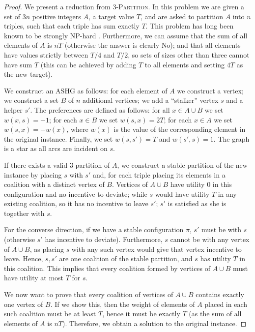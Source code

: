 \documentclass[letterpaper,USenglish,cleveref, autoref, thm-restate]{lipics-v2021}
\begin{document}
\begin{proof} We present a reduction from \textsc{3-Partition}. In this problem
we are given a set of $3n$ positive integers $A$, a target value $T$, and are
asked to partition $A$ into $n$ triples, such that each triple has sum exactly
$T$. This problem has long been known to be strongly NP-hard \cite{GareyJ79}.
Furthermore, we can assume that the sum of all elements of $A$ is $nT$
(otherwise the answer is clearly No); and that all elements have values
strictly between $T/4$ and $T/2$, so sets of sizes other than three cannot have
sum $T$ (this can be achieved by adding $T$ to all elements and setting $4T$ as
the new target). 

We construct an ASHG as follows: for each element of $A$ we construct a vertex;
we construct a set $B$ of $n$ additional vertices; we add a ``stalker'' vertex
$s$ and a helper $s'$. The preferences are defined as follows: for all $x\in
A\cup B$ we set $w(x,s)=-1$; for each $x\in B$ we set $w(s,x)=2T$; for each
$x\in A$ we set $w(s,x)=-w(x)$, where $w(x)$ is the value of the corresponding
element in the original instance. Finally, we set $w(s,s')=T$ and $w(s',s)=1$.
The graph is a star as all arcs are incident on $s$.

If there exists a valid 3-partition of $A$, we construct a stable partition of
the new instance by placing $s$ with $s'$ and, for each triple placing its
elements in a coalition with a distinct vertex of $B$. Vertices of $A\cup B$
have utility $0$ in this configuration and no incentive to deviate; while $s$
would have utility $T$ in any existing coalition, so it has no incentive to
leave $s'$; $s'$ is satisfied as she is together with $s$.

For the converse direction, if we have a stable configuration $\pi$, $s'$ must
be with $s$ (otherwise $s'$ has incentive to deviate). Furthermore, $s$ cannot
be with any vertex of $A\cup B$, as placing $s$ with any such vertex would give
that vertex incentive to leave. Hence, $s,s'$ are one coalition of the stable
partition, and $s$ has utility $T$ in this coalition. This implies that every
coalition formed by vertices of $A\cup B$ must have utility at most $T$ for
$s$.

We now want to prove that every coalition of vertices of $A\cup B$ contains
exactly one vertex of $B$. If we show this, then the weight of elements of $A$
placed in each such coalition must be at least $T$, hence it must be exactly
$T$ (as the sum of all elements of $A$ is $nT$). Therefore, we obtain a
solution to the original instance.


\end{proof}
\end{document}
